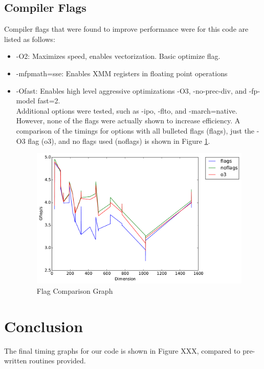 \documentclass{article}	 %
\begin{document}
\subsection{Compiler Flags}
Compiler flags that were found to improve performance were for this code are listed as follows: \\
\begin{itemize}
\item -O2: Maximizes speed, enables vectorization. Basic optimize flag. 
\item -mfpmath=sse: Enables XMM registers in floating point operations
\item -Ofast: Enables high level aggressive optimizations -O3, -no-prec-div, and -fp-model fast=2. 
\\ 

Additional options were tested, such as -ipo, -flto, and -march=native. However, none of the flags were actually shown to increase efficiency. A comparison of the timings for options with all bulleted flags (flags), just the -O3 flag (o3), and no flags used (noflags) is shown in Figure \ref{fig:flags}. 

\begin{figure}[H]
\centering
  \centering
  \includegraphics[width=.6\linewidth]{timing_flagcompare.pdf}
  \caption{Flag Comparison Graph}
  \label{fig:flags}
  \end{figure}

\end{itemize}

\section{Conclusion}

The final timing graphs for our code is shown in Figure XXX, compared to pre-written routines provided.

\end{document}
